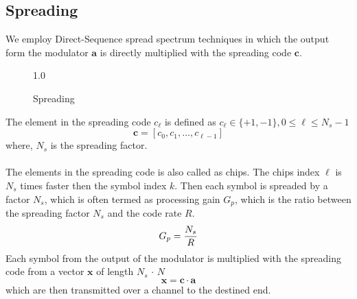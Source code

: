 \subsection{Spreading}
We employ Direct-Sequence spread spectrum techniques in which the output form the modulator $\mathrm{\mathbf{a}}$ is directly multiplied with the spreading code $\mathrm{\mathbf{c}}$.
\begin{figure}[htb]
\centerline{  {1.0} }
\caption{Spreading}
\end{figure}
The element in the spreading code $c_\ell$ is defined as $c_\ell \in \{+1,-1\}, 0 \leq \ell \leq N_s-1$ 
\begin{equation}
\mathrm{\mathbf{c}}=[c_0,c_1,\dots,c_{\ell-1}]
\end{equation}
where, $N_s$ is the spreading factor.\\ \\
The elements in the spreading code is also called as chips. The chips index $\ell$ is $N_s$ times faster then the symbol index $k$. Then each symbol is spreaded by a factor $N_s$, which is often termed as processing gain $G_p$, which is the ratio between the spreading factor $N_s$ and the code rate $R$.
\begin{equation}
G_p=\frac{\hbox{$N_s$}}{\hbox{$R$}}
\end{equation}
Each symbol from the output of the modulator is multiplied with the spreading code from a vector $\mathrm{\mathbf{x}}$ of length $N_s\,\cdot\, N$
\begin{equation}
\mathrm{\mathbf{x}} = \mathrm{\mathbf{c}} \cdot \mathrm{\mathbf{a}} 
\end{equation}
which are then transmitted over a channel to the destined end. \\ \\
